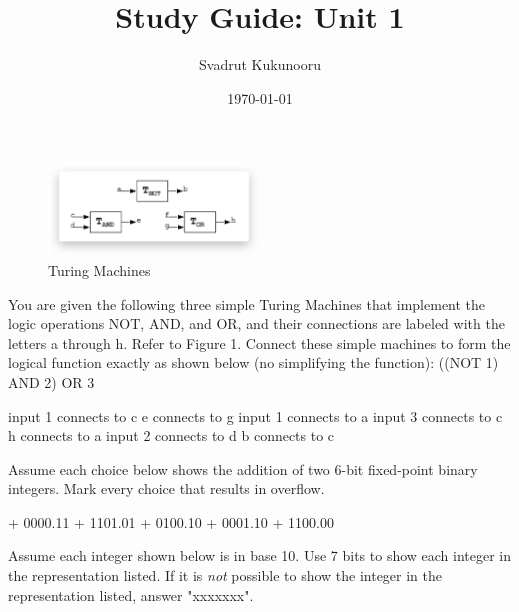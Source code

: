 \documentclass[letterpaper]{exam}
\title{Study Guide: Unit 1}
\author{Svadrut Kukunooru}
\date{\today}
\begin{document}
\begin{titlepage}
    \maketitle
\end{titlepage}
\begin{figure}[t]
    \centering
    \includegraphics[width=0.5\textwidth]{turing1}
    \caption{Turing Machines}
\end{figure}
   \begin{questions}
       \question You are given the following three simple Turing Machines that implement the logic operations NOT, AND, and OR, and their connections are labeled with the letters a through h. Refer to Figure 1. Connect these simple machines to form the logical function exactly as shown below (no simplifying the function): ((NOT 1) AND 2) OR 3
       \begin{checkboxes}
        \choice input 1 connects to c 
        \choice e connects to g
        \choice input 1 connects to a
        \choice input 3 connects to c 
        \choice h connects to a
        \choice input 2 connects to d 
        \choice b connects to c
       \end{checkboxes}
              \question Assume each choice below shows the addition of two 6-bit fixed-point binary integers. Mark every choice that results in overflow. 
              \begin{checkboxes}
                 + 0000.11
                 + 1101.01 
                 + 0100.10
                 + 0001.10
                 + 1100.00
              \end{checkboxes}
              \question Assume each integer shown below is in base 10. Use 7 bits to show each integer in the representation listed. If it is \textit{not} possible to show the integer in the representation listed, answer "xxxxxxx".            
\end{questions}
\end{document}
